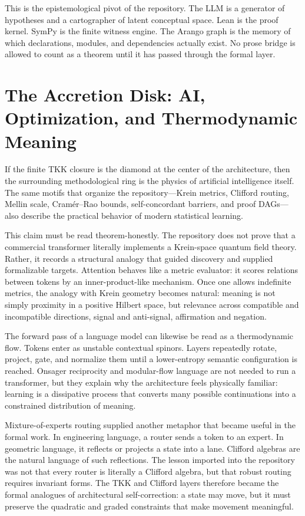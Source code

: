 This is the epistemological pivot of the repository.  The LLM is a generator of
hypotheses and a cartographer of latent conceptual space.  Lean is the proof
kernel.  SymPy is the finite witness engine.  The Arango graph is the memory of
which declarations, modules, and dependencies actually exist.  No prose bridge
is allowed to count as a theorem until it has passed through the formal layer.

\section{The Accretion Disk: AI, Optimization, and Thermodynamic Meaning}

If the finite TKK closure is the diamond at the center of the architecture, then
the surrounding methodological ring is the physics of artificial intelligence
itself.  The same motifs that organize the repository---Krein metrics, Clifford
routing, Mellin scale, Cram\'er--Rao bounds, self-concordant barriers, and proof
DAGs---also describe the practical behavior of modern statistical learning.

This claim must be read theorem-honestly.  The repository does not prove that a
commercial transformer literally implements a Krein-space quantum field theory.
Rather, it records a structural analogy that guided discovery and supplied
formalizable targets.  Attention behaves like a metric evaluator: it scores
relations between tokens by an inner-product-like mechanism.  Once one allows
indefinite metrics, the analogy with Krein geometry becomes natural: meaning is
not simply proximity in a positive Hilbert space, but relevance across
compatible and incompatible directions, signal and anti-signal, affirmation and
negation.

The forward pass of a language model can likewise be read as a thermodynamic
flow.  Tokens enter as unstable contextual spinors.  Layers repeatedly rotate,
project, gate, and normalize them until a lower-entropy semantic configuration
is reached.  Onsager reciprocity and modular-flow language are not needed to run
a transformer, but they explain why the architecture feels physically familiar:
learning is a dissipative process that converts many possible continuations into
a constrained distribution of meaning.

Mixture-of-experts routing supplied another metaphor that became useful in the
formal work.  In engineering language, a router sends a token to an expert.  In
geometric language, it reflects or projects a state into a lane.  Clifford
algebras are the natural language of such reflections.  The lesson imported
into the repository was not that every router is literally a Clifford algebra,
but that robust routing requires invariant forms.  The TKK and Clifford layers
therefore became the formal analogues of architectural self-correction: a state
may move, but it must preserve the quadratic and graded constraints that make
movement meaningful.

